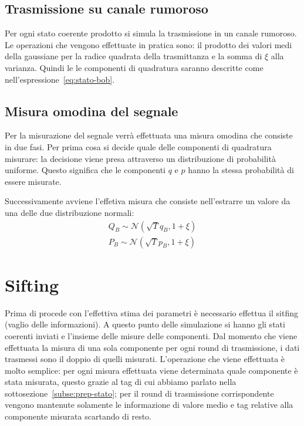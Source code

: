 \subsection{Trasmissione su canale rumoroso}
Per ogni stato coerente prodotto si simula la trasmissione in un canale rumoroso. Le operazioni che vengono effettuate in pratica sono: il prodotto dei valori medi della gaussiane per la radice quadrata della trasmittanza e la somma di $\xi$ alla varianza. Quindi le le componenti di quadratura saranno descritte come nell'espressione~\ref{eq:stato-bob}.

\subsection{Misura omodina del segnale}
Per la misurazione del segnale verr\`a effettuata una misura omodina che consiste in due fasi. Per prima cosa si decide quale delle componenti di quadratura misurare: la decisione viene presa attraverso un distribuzione di probabilit\`a uniforme. Questo significa che le componenti $q$ e $p$ hanno la stessa probabilit\`a di essere misurate.

Successivamente avviene l'effetiva misura che consiste nell'estrarre un valore da una delle due distribuzione normali:
\begin{equation}\label{eq:normal_dist_bob}
\begin{split}
Q_B \sim \mathcal N(\sqrt{T} q_B, 1 + \xi) \\
P_B \sim \mathcal N(\sqrt{T} p_B, 1 + \xi)
\end{split}
\end{equation}

\section{Sifting}\label{se:sifting}
Prima di procede con l'effettiva stima dei parametri \`e necessario effettua il sitfing (vaglio delle informazioni). A questo punto delle simulazione si hanno gli stati coerenti inviati e l'insieme delle misure delle componenti. Dal momento che viene effettuata la misura di una sola componente per ogni round di trasmissione, i dati trasmessi sono il doppio di quelli misurati. L'operazione che viene effettuata \`e molto semplice: per ogni misura effettuata viene determinata quale componente \`e stata misurata, questo grazie al tag di cui abbiamo parlato nella sottosezione~\ref{subse:prep-stato}; per il round di trasmissione corrispondente vengono mantenute solamente le informazione di valore medio e tag relative alla componente misurata scartando di resto.

